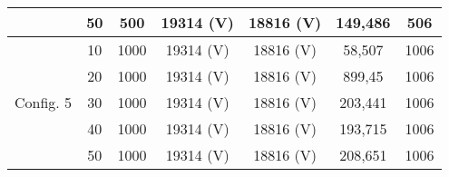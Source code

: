 \begin{table}[htbp]
\begin{tabular}{c|c|c|c|c|c|c}
          & 50    & 500   & 19314 (V) & 18816 (V) & 149,486 & 506 \\
    \hline
	\multirow{5}[0]{*}{Config. 5} & 10    & 1000  & 19314 (V) & 18816 (V) & 58,507 & 1006 \\
          & 20    & 1000  & 19314 (V) & 18816 (V) & 899,45 & 1006 \\
          & 30    & 1000  & 19314 (V) & 18816 (V) & 203,441 & 1006 \\
          & 40    & 1000  & 19314 (V) & 18816 (V) & 193,715 & 1006 \\
          & 50    & 1000  & 19314 (V) & 18816 (V) & 208,651 & 1006 \\
    \bottomrule
    \end{tabular}%
  \label{tab:addlabel}%
\end{table}%
